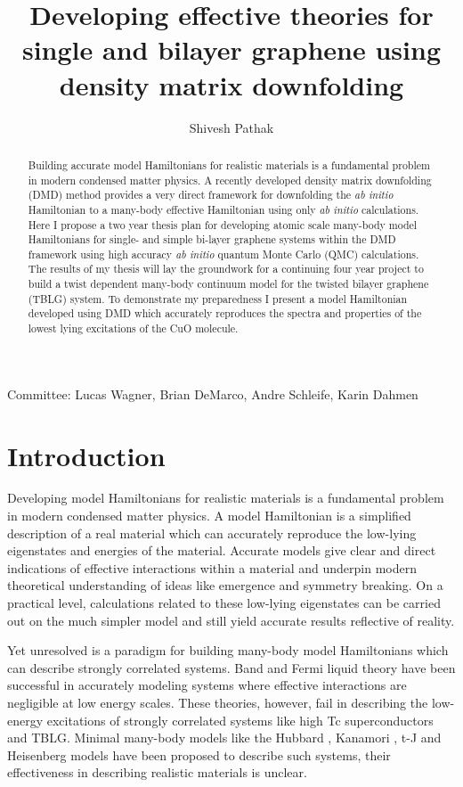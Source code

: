\documentclass[12pt]{article}
\author{Shivesh Pathak}
\title{Developing effective theories for single and bilayer graphene using density matrix downfolding}
\begin{document}
\maketitle
\begin{abstract}
Building accurate model Hamiltonians for realistic materials is a fundamental problem in modern condensed matter physics.
A recently developed density matrix downfolding (DMD) \cite{Zheng2017} method provides a very direct framework for downfolding the \textit{ab initio} Hamiltonian to a many-body effective Hamiltonian using only \textit{ab initio} calculations. 
Here I propose a two year thesis plan for developing atomic scale many-body model Hamiltonians for single- and simple bi-layer graphene systems within the DMD framework using high accuracy \textit{ab initio} quantum Monte Carlo (QMC) calculations.
The results of my thesis will lay the groundwork for a continuing four year project to build a twist dependent many-body continuum model for the twisted bilayer graphene (TBLG) system.
To demonstrate my preparedness I present a model Hamiltonian developed using DMD which accurately reproduces the spectra and properties of the lowest lying excitations of the CuO molecule.
\end{abstract}
Committee: Lucas Wagner, Brian DeMarco, Andre Schleife, Karin Dahmen
\pagebreak

\section{Introduction}
Developing model Hamiltonians for realistic materials is a fundamental problem in modern condensed matter physics.
A model Hamiltonian is a simplified description of a real material which can accurately reproduce the low-lying eigenstates and energies of the material.
Accurate models give clear and direct indications of effective interactions within a material and underpin modern theoretical understanding of ideas like emergence and symmetry breaking.
On a practical level, calculations related to these low-lying eigenstates can be carried out on the much simpler model and still yield accurate results reflective of reality.

Yet unresolved is a paradigm for building many-body model Hamiltonians which can describe strongly correlated systems.
Band and Fermi liquid theory have been successful in accurately modeling systems where effective interactions are negligible at low energy scales.
These theories, however, fail in describing the low-energy excitations of strongly correlated systems like high Tc superconductors and TBLG.
Minimal many-body models like the Hubbard \cite{Hubbard1963}, Kanamori \cite{10.1143/PTP.30.275}, t-J \cite{Chao_1977} and Heisenberg models have been proposed to describe such systems, their effectiveness in describing realistic materials is unclear.
\end{document}
